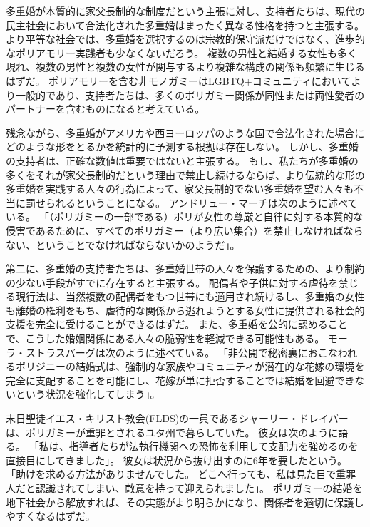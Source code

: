 \documentclass[paper=a4,book,openany]{jlreq}
\begin{document}
多重婚が本質的に家父長制的な制度だという主張に対し、支持者たちは、現代の民主社会において合法化された多重婚はまったく異なる性格を持つと主張する。
より平等な社会では、多重婚を選択するのは宗教的保守派だけではなく、進歩的なポリアモリー実践者も少なくないだろう。
複数の男性と結婚する女性も多く現れ、複数の男性と複数の女性が関与するより複雑な構成の関係も頻繁に生じるはずだ。
ポリアモリーを含む非モノガミーはLGBTQ+コミュニティにおいてより一般的であり、支持者たちは、多くのポリガミー関係が同性または両性愛者のパートナーを含むものになると考えている。

残念ながら、多重婚がアメリカや西ヨーロッパのような国で合法化された場合にどのような形をとるかを統計的に予測する根拠は存在しない。
しかし、多重婚の支持者は、正確な数値は重要ではないと主張する。
もし、私たちが多重婚の多くをそれが家父長制的だという理由で禁止し続けるならば、より伝統的な形の多重婚を実践する人々の行為によって、家父長制的でない多重婚を望む人々も不当に罰せられるということになる。
アンドリュー・マーチは次のように述べている。
「（ポリガミーの一部である）ポリが女性の尊厳と自律に対する本質的な侵害であるために、すべてのポリガミー（より広い集合）を禁止しなければならない、ということでなければならないかのようだ」\citep{march11:_is_there_right_polyg}。

第二に、多重婚の支持者たちは、多重婚世帯の人々を保護するための、より制約の少ない手段がすでに存在すると主張する。
配偶者や子供に対する虐待を禁じる現行法は、当然複数の配偶者をもつ世帯にも適用され続けるし、多重婚の女性も離婚の権利をもち、虐待的な関係から逃れようとする女性に提供される社会的支援を完全に受けることができるはずだ。
また、多重婚を公的に認めることで、こうした婚姻関係にある人々の脆弱性を軽減できる可能性もある。
モーラ・ストラスバーグは次のように述べている。
「非公開で秘密裏におこなわれるポリジニーの結婚式は、強制的な家族やコミュニティが潜在的な花嫁の環境を完全に支配することを可能にし、花嫁が単に拒否することでは結婚を回避できないという状況を強化してしまう」\citep[p.369 fn.116.5]{strassberg02:_crime_polyg}。

末日聖徒イエス・キリスト教会(FLDS)の一員であるシャーリー・ドレイパーは、ポリガミーが重罪とされるユタ州で暮らしていた。
彼女は次のように語る。
「私は、指導者たちが法執行機関への恐怖を利用して支配力を強めるのを直接目にしてきました」。
彼女は状況から抜け出すのに6年を要したという。
「助けを求める方法がありませんでした。
どこへ行っても、私は見た目で重罪人だと認識されてしまい、敵意を持って迎えられました」\citep{smardon20:_polyg_is_decrim_utah}。
ポリガミーの結婚を地下社会から解放すれば、その実態がより明らかになり、関係者を適切に保護しやすくなるはずだ。
\end{document}
